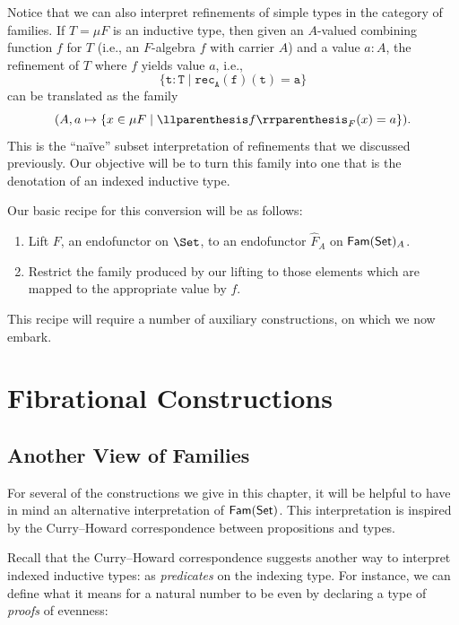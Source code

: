 Notice that we can also interpret refinements of simple types in the category of families. If $T =
\mu F$ is an inductive type, then given an $A$-valued combining function $f$ for $T$ (i.e., an
$F$-algebra $f$ with carrier $A$) and a value $a : A$, the refinement of $T$ where $f$ yields value
$a$, i.e.,
\[ \texttt{\{} \mathtt{t : T} \mid \mathtt{rec_A(f)(t) = a} \texttt{\}} \]
can be translated as the family
\[ (A, a \mapsto \{ x \in \mu F \mid \llpr{f}_{F}(x) = a \}). \]
This is the ``na\"ive'' subset interpretation of refinements that we discussed previously. Our
objective will be to turn this family into one that is the denotation of an indexed inductive type.

Our basic recipe for this conversion will be as follows:
\begin{enumerate}
  \item Lift $F$, an endofunctor on $\Set$, to an endofunctor $\hat F_A$ on $\mathsf{Fam}(\mathsf{Set})_A$.
  \item Restrict the family produced by our lifting to those elements which are mapped to the
        appropriate value by $f$.
\end{enumerate}

This recipe will require a number of auxiliary constructions, on which we now embark.


\section{Fibrational Constructions}

\subsection{Another View of Families}

For several of the constructions we give in this chapter, it will be helpful to have in mind an
alternative interpretation of $\mathsf{Fam}(\mathsf{Set})$. This interpretation is inspired by the Curry--Howard
correspondence between propositions and types.

Recall that the Curry--Howard correspondence suggests another way to interpret indexed inductive
types: as \emph{predicates} on the indexing type. For instance, we can define what it means for a
natural number to be even by declaring a type of \emph{proofs} of evenness:


